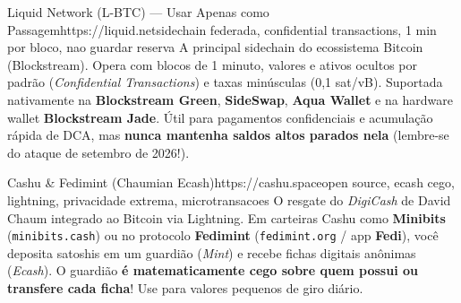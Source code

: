 \documentclass{pousadaguide}
\begin{document}
\begin{ferramenta}[recomendado,logo=liquid]{Liquid Network (L-BTC) — Usar Apenas como Passagem}{https://liquid.net}{sidechain federada, confidential transactions, 1 min por bloco, nao guardar reserva}
A principal sidechain do ecossistema Bitcoin (Blockstream). Opera com blocos de 1 minuto, valores e ativos ocultos por padrão (\emph{Confidential Transactions}) e taxas minúsculas (0,1 sat/vB). Suportada nativamente na \textbf{Blockstream Green}, \textbf{SideSwap}, \textbf{Aqua Wallet} e na hardware wallet \textbf{Blockstream Jade}. Útil para pagamentos confidenciais e acumulação rápida de DCA, mas \textbf{nunca mantenha saldos altos parados nela} (lembre-se do ataque de setembro de 2026!). 
\end{ferramenta}

\begin{ferramenta}[recomendado,logo=cashu]{Cashu \& Fedimint (Chaumian Ecash)}{https://cashu.space}{open source, ecash cego, lightning, privacidade extrema, microtransacoes}
O resgate do \emph{DigiCash} de David Chaum integrado ao Bitcoin via Lightning. Em carteiras Cashu como \textbf{Minibits} (\texttt{minibits.cash}) ou no protocolo \textbf{Fedimint} (\texttt{fedimint.org} / app \textbf{Fedi}), você deposita satoshis em um guardião (\emph{Mint}) e recebe fichas digitais anônimas (\emph{Ecash}). O guardião \textbf{é matematicamente cego sobre quem possui ou transfere cada ficha}! Use para valores pequenos de giro diário. 
\end{ferramenta}
\end{document}
